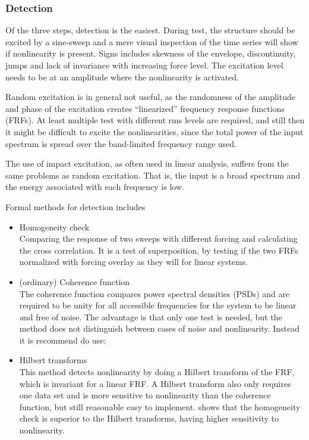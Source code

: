 

\subsubsection{Detection}
\label{sec:detection}

Of the three steps, detection is the easiest. During test, the structure should
be excited by a sine-sweep and a mere visual inspection of the time series will
show if nonlinearity is present. Signs includes skewness of the envelope,
discontinuity, jumps and lack of invariance with increasing force level. The
excitation level needs to be at an amplitude where the nonlinearity is
activated.

Random excitation is in general not useful, as the randomness of the amplitude
and phase of the excitation creates ``linearized'' frequency response functions
(FRFs). At least multiple test with different rms levels are required, and still
then it might be difficult to excite the nonlinearities, since the total power
of the input spectrum is spread over the band-limited frequency range used.

The use of impact excitation, as often used in linear analysis, suffers from the
same problems as random excitation. That is, the input is a broad spectrum and
the energy associated with each frequency is low.


Formal methods for detection includes

\begin{itemize}
\item Homogeneity check \\
  Comparing the response of two sweeps with different forcing and calculating
  the cross correlation. It is a test of superposition, by testing if the two FRFs
  normalized with forcing overlay as they will for linear systems.
\item (ordinary) Coherence function \\
  The coherence function compares power spectral densities (PSDs) and are
  required to be unity for all accessible frequencies for the system to be
  linear {\textit and} free of noise. The advantage is that only one test is needed,
  but the method does not distinguish between cases of noise and
  nonlinearity. Instead it is recommend do use:
\item Hilbert transforms \\
  This method detects nonlinearity by doing a Hilbert transform of the FRF,
  which is invariant for a linear FRF.
  A Hilbert transform also only requires one data set and is more sensitive to
  nonlinearity than the coherence function, but still reasonable easy to
  implement. \textcite{kragh2010a} shows that the homogeneity check is superior to
  the Hilbert transforms, having higher sensitivity to nonlinearity.
\end{itemize}

